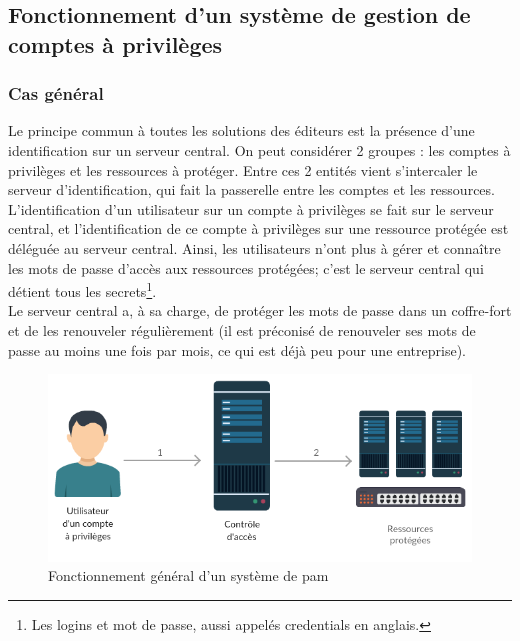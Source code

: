 \subsection{Fonctionnement d'un système de gestion de comptes à privilèges}

\subsubsection{Cas général}
Le principe commun à toutes les solutions des éditeurs est la présence d'une identification sur un serveur central. On peut considérer 2 groupes : les comptes à privilèges et les ressources à protéger. Entre ces 2 entités vient s'intercaler le serveur d'identification, qui fait la passerelle entre les comptes et les ressources.\\
L'identification d'un utilisateur sur un compte à privilèges se fait sur le serveur central, et l'identification de ce compte à privilèges sur une ressource protégée est déléguée au serveur central. Ainsi, les utilisateurs n'ont plus à gérer et connaître les mots de passe d'accès aux ressources protégées; c'est le serveur central qui détient tous les secrets\footnote{Les logins et mot de passe, aussi appelés \og \glspl{credential} \fg{} en anglais.}.\\
Le serveur central a, à sa charge, de protéger les mots de passe dans un coffre-fort et de les renouveler régulièrement (il est préconisé de renouveler ses mots de passe au moins une fois par mois, ce qui est déjà peu pour une entreprise).

\begin{figure}[!ht]
    \center
    \includegraphics[width=\textwidth]{./images/Schema_ultra_light_PAM.png}
    \caption{Fonctionnement général d'un système de \gls{pam}}
\end{figure}

